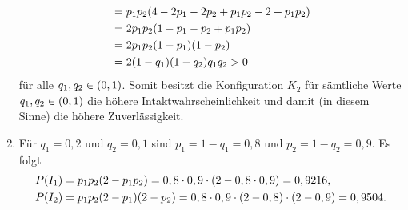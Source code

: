 \documentclass{exercise}
\begin{document}
\begin{enumerate}
\begin{align*}
            &= p_1 p_2\parentheses*{4 - 2p_1 - 2p_2 + p_1 p_2 - 2 + p_1 p_2}\\
            &= 2p_1 p_2\parentheses*{1 - p_1 - p_2 + p_1 p_2}\\
            &= 2p_1 p_2\parentheses*{1 - p_1}\parentheses*{1 - p_2}\\
            &= 2\parentheses*{1 - q_1}\parentheses*{1 - q_2}q_1 q_2 > 0
        \end{align*}
        für alle \(q_1, q_2 \in \parentheses*{0, 1}\).
        Somit besitzt die Konfiguration \(K_2\) für sämtliche Werte \(q_1, q_2 \in \parentheses*{0, 1}\) die höhere Intaktwahrscheinlichkeit und damit (in diesem Sinne) die höhere Zuverlässigkeit.
        \item Für \(q_1 = 0,2\) und \(q_2 = 0,1\) sind \(p_1 = 1 - q_1 = 0,8\) und \(p_2 = 1 - q_2 = 0,9\).
        Es folgt
        \begin{align*}
            P\parentheses*{I_1} &= p_1 p_2\parentheses*{2 - p_1 p_2} = 0,8 \cdot 0,9 \cdot \parentheses*{2 - 0,8 \cdot 0,9} = 0,9216,\\
            P\parentheses*{I_2} &= p_1 p_2\parentheses*{2 - p_1}\parentheses*{2 - p_2} = 0,8 \cdot 0,9 \cdot \parentheses*{2 - 0,8} \cdot \parentheses*{2 - 0,9} = 0,9504.
        \end{align*}
    \end{enumerate}
\end{document}
